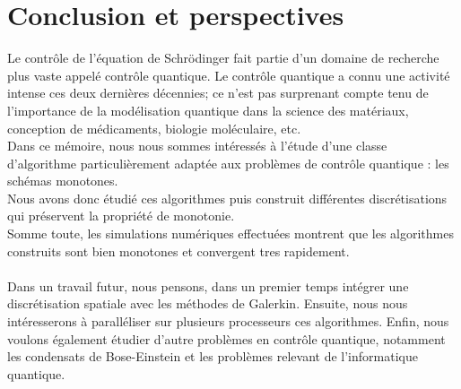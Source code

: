 \chapter*{Conclusion et perspectives}

Le contrôle de l’équation de Schrödinger fait partie d’un domaine de recherche plus vaste appelé contrôle quantique. Le contrôle quantique a connu une activité intense ces deux dernières décennies; ce n'est pas surprenant compte tenu de l'importance de la modélisation quantique dans la science des matériaux, conception de médicaments, biologie moléculaire, etc.\\
Dans ce mémoire, nous nous sommes intéressés à l'étude d'une classe d'algorithme particulièrement adaptée aux problèmes de contrôle quantique : les schémas monotones.\\
Nous avons donc étudié ces algorithmes puis construit différentes discrétisations qui préservent la propriété de monotonie.\\
Somme toute, les simulations numériques effectuées montrent que les algorithmes construits sont bien monotones et convergent tres rapidement.\\\\

Dans un travail futur, nous pensons, dans un premier temps intégrer une discrétisation spatiale avec les méthodes de Galerkin. Ensuite, nous nous intéresserons à paralléliser sur plusieurs processeurs ces algorithmes. Enfin, nous voulons également étudier d'autre problèmes en contrôle quantique, notamment les condensats de Bose-Einstein et les problèmes relevant de l'informatique quantique.